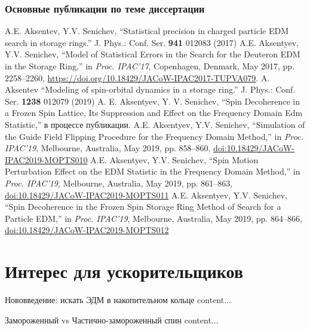\documentclass[14pt]{beamer}
\begin{document}
\begin{frame}[allowframebreaks]
	\frametitle{Основные публикации по теме диссертации}
	\begin{thebibliography}{9}
		A.E. Aksentev, Y.V. Senichev, ``Statistical precision in charged particle {EDM} search in storage rings.'' J. Phys.: Conf. Ser. \textbf{941} 012083 (2017)
		A.E. Aksentyev, Y.V. Senichev,
		``Model of Statistical Errors in the Search for the Deuteron EDM in the Storage Ring,''
		in \emph{Proc. IPAC'17}, Copenhagen, Denmark, May 2017, pp. 2258--2260,
		\url{https://doi.org/10.18429/JACoW-IPAC2017-TUPVA079}.
		A. Aksentev ``Modeling of spin-orbital dynamics in a storage ring.'' J. Phys.: Conf. Ser. \textbf{1238} 012079 (2019)		
		A. E. Aksentyev, Y. V. Senichev, ``Spin Decoherence in a Frozen Spin Lattice, Its Suppression and Effect on the Frequency Domain Edm Statistic,''  в процессе публикации.
		A.E. Aksentyev, Y.V. Senichev, ``Simulation of the Guide Field Flipping Procedure for the Frequency Domain Method,'' in \emph{Proc. IPAC'19}, Melbourne, Australia, May 2019, pp. 858--860, \url{doi:10.18429/JACoW-IPAC2019-MOPTS010}
		A.E. Aksentyev, Y.V. Senichev, ``Spin Motion Perturbation Effect on the EDM Statistic in the Frequency Domain Method,'' in \emph{Proc. IPAC'19}, Melbourne, Australia, May 2019, pp. 861--863,
		\url{doi:10.18429/JACoW-IPAC2019-MOPTS011}
		A.E. Aksentyev, Y.V. Senichev, ``Spin Decoherence in the Frozen Spin Storage Ring Method of Search for a Particle EDM,'' in \emph{Proc. IPAC'19}, Melbourne, Australia, May 2019, pp. 864--866,
		\url{doi:10.18429/JACoW-IPAC2019-MOPTS012}
	\end{thebibliography}
\end{frame}

\section{Интерес для ускорительщиков}
\begin{frame}{Нововведение: искать ЭДМ в накопительном кольце}
	content...
\end{frame}

\begin{frame}{Замороженный vs Частично-замороженный спин}
	content...
\end{frame}
\end{document}
